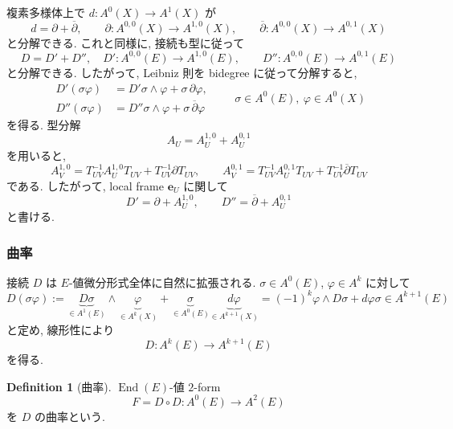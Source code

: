 \documentclass[dvipdfmx,a4paper,11pt]{article} %
\theoremstyle{definition}
\newtheorem{defn}[thm]{Definition}
\theoremstyle{remark}
\numberwithin{equation}{section}
\newcommand{\End}[0]{\operatorname{End}}
\begin{document}
複素多様体上で \(d : A^0(X) \to A^1(X)\) が
\[
d=\partial+\overline{\partial},\qquad \partial\colon A^{0,0}(X)\longrightarrow A^{1,0}(X),\qquad \overline{\partial}\colon A^{0,0}(X)\longrightarrow A^{0,1}(X)
\]
と分解できる. これと同様に, 接続も型に従って
\[
D=D'+D'',
\quad
D'\colon A^{0,0}(E)\longrightarrow A^{1,0}(E),\qquad D''\colon A^{0,0}(E)\longrightarrow A^{0,1}(E)
\]
と分解できる. したがって, Leibniz 則を bidegree に従って分解すると,
\[
\begin{aligned}
D'(\sigma\varphi)&=D'\sigma\wedge \varphi+\sigma\, \partial\varphi,\\
D''(\sigma\varphi)&=D''\sigma\wedge \varphi+\sigma\, \overline{\partial}\varphi
\end{aligned}
\qquad \sigma\in A^0(E),\ \varphi\in A^{0}(X)
\]
を得る.
型分解
\[
A_U=A_U^{1,0}+A_U^{0,1}
\]
を用いると,
\[
A_V^{1,0}=T_{UV}^{-1}A_U^{1,0}T_{UV}+T_{UV}^{-1}\partial T_{UV},\qquad
A_V^{0,1}=T_{UV}^{-1}A_U^{0,1}T_{UV}+T_{UV}^{-1}\overline{\partial} T_{UV}
\]
である. したがって, local frame \(\mathbf{e}_U\) に関して
\[
D'=\partial+A_U^{1,0},\qquad D''=\overline{\partial}+A_U^{0,1}
\]
と書ける.

\subsubsection{曲率}

接続 \(D\) は \(E\)-値微分形式全体に自然に拡張される. \(\sigma\in A^0(E)\), \(\varphi\in A^k\) に対して
\[
D(\sigma\varphi):=
\underbrace{D\sigma}_{\in A^1(E)}\wedge 
\underbrace{\varphi}_{\in A^k(X)}+
\underbrace{\sigma}_{\in A^0(E)}
\underbrace{d\varphi}_{\in A^{k+1}(X)}
=
(-1)^{k} \varphi \wedge D\sigma+d\varphi \sigma 
\in A^{k+1}(E)
\]
と定め, 線形性により
\[
D\colon A^k(E)\longrightarrow A^{k+1}(E)
\]
を得る.

\begin{defn}[曲率]
\(\End(E)\)-値 \(2\)-form
\[
F=D\circ D: A^0(E) \to A^2(E)
\]
を \(D\) の曲率という.
\quad
\end{defn}
\end{document}
